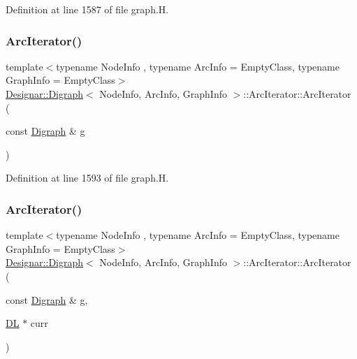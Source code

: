 Definition at line 1587 of file graph.\+H.

\mbox{\label{class_designar_1_1_digraph_1_1_arc_iterator_ac16db42766a60aa488fb4db5492c1361}} 
\subsubsection{\texorpdfstring{Arc\+Iterator()}{ArcIterator()}\hspace{0.1cm}{\footnotesize\ttfamily [2/5]}}
{\footnotesize\ttfamily template$<$typename Node\+Info , typename Arc\+Info  = Empty\+Class, typename Graph\+Info  = Empty\+Class$>$ \\
\hyperlink{class_designar_1_1_digraph}{Designar\+::\+Digraph}$<$ Node\+Info, Arc\+Info, Graph\+Info $>$\+::Arc\+Iterator\+::\+Arc\+Iterator (\begin{DoxyParamCaption}\item[{const \hyperlink{class_designar_1_1_digraph}{Digraph} \&}]{g }\end{DoxyParamCaption})\hspace{0.3cm}{\ttfamily [inline]}}



Definition at line 1593 of file graph.\+H.

\mbox{\label{class_designar_1_1_digraph_1_1_arc_iterator_ae4a8b9172d19134e71693734003ee350}} 
\subsubsection{\texorpdfstring{Arc\+Iterator()}{ArcIterator()}\hspace{0.1cm}{\footnotesize\ttfamily [3/5]}}
{\footnotesize\ttfamily template$<$typename Node\+Info , typename Arc\+Info  = Empty\+Class, typename Graph\+Info  = Empty\+Class$>$ \\
\hyperlink{class_designar_1_1_digraph}{Designar\+::\+Digraph}$<$ Node\+Info, Arc\+Info, Graph\+Info $>$\+::Arc\+Iterator\+::\+Arc\+Iterator (\begin{DoxyParamCaption}\item[{const \hyperlink{class_designar_1_1_digraph}{Digraph} \&}]{g,  }\item[{\hyperlink{class_designar_1_1_d_l}{DL} $\ast$}]{curr }\end{DoxyParamCaption})\hspace{0.3cm}{\ttfamily [inline]}}



